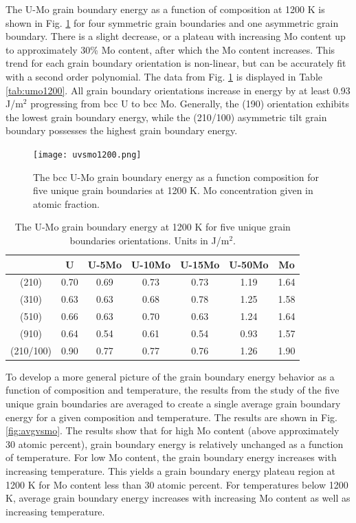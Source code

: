 \documentclass[review]{elsarticle}
\begin{document}
\FloatBarrier

The U-Mo grain boundary energy as a function of composition at 1200 K is shown in Fig. \ref{fig:umo1200} for four symmetric grain boundaries and one asymmetric grain boundary. There is a slight decrease, or a plateau with increasing Mo content up to approximately 30\% Mo content, after which the Mo content increases. This trend for each grain boundary orientation is non-linear, but can be accurately fit with a second order polynomial. The data from Fig. \ref{fig:umo1200} is displayed in Table \ref{tab:umo1200}. All grain boundary orientations increase in energy by at least 0.93 J/m$^{2}$ progressing from bcc U to bcc Mo. Generally, the (190) orientation exhibits the lowest grain boundary energy, while the (210/100) asymmetric tilt grain boundary possesses the highest grain boundary energy.

\begin{figure}[h]
 \centering
 \texttt{[image: uvsmo1200.png]} 
 \caption{The bcc U-Mo grain boundary energy as a function composition for five unique grain boundaries at 1200 K. Mo concentration given in atomic fraction.}
 \label{fig:umo1200}
\end{figure}

\begin{table}[h]
\caption{The U-Mo grain boundary energy at 1200 K for five unique grain boundaries orientations. Units in J/m$^{2}$. } \label{tab:umo1200}
\begin{center}
\begin{tabular}{|c|c|c|c|c|c|c|}
	\hline
 & U & U-5Mo & U-10Mo & U-15Mo & U-50Mo & Mo \\
\hline
(210)	 & 0.70 & 0.69 & 0.73 & 0.73 & 1.19 & 1.64 \\
(310)	 & 0.63 & 0.63 & 0.68 & 0.78 & 1.25 & 1.58 \\
(510)	 & 0.66 & 0.63 & 0.70 & 0.63 & 1.24 & 1.64 \\
(910)	 & 0.64 & 0.54 & 0.61 & 0.54 & 0.93 & 1.57 \\
(210/100) & 0.90 & 0.77 & 0.77 & 0.76 & 1.26 & 1.90 \\
 	 \hline
\end{tabular}
\end{center}
\label{default}
\end{table}

\FloatBarrier

To develop a more general picture of the grain boundary energy behavior as a function of composition and temperature, the results from the study of the five unique grain boundaries are averaged to create a single average grain boundary energy for a given composition and temperature. The results are shown in Fig. \ref{fig:avgvsmo}. The results show that for high Mo content (above approximately 30 atomic percent), grain boundary energy is relatively unchanged as a function of temperature. For low Mo content, the grain boundary energy increases with increasing temperature. This yields a grain boundary energy plateau region at 1200 K for Mo content less than 30 atomic percent. For temperatures below 1200 K, average grain boundary energy increases with increasing Mo content as well as increasing temperature. 
\end{document}
